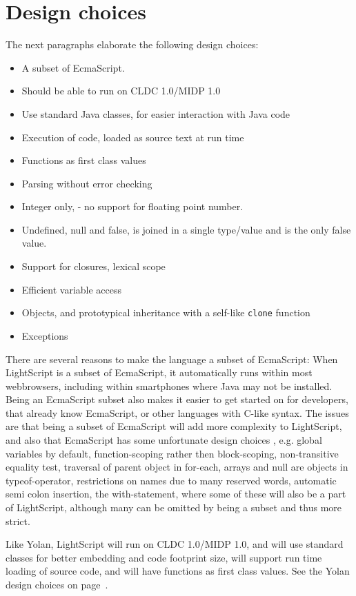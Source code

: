 \documentclass[11pt]{report}
\begin{document}
\section{Design choices}
The next paragraphs elaborate the following design choices:
\begin{itemize}
\item A subset of EcmaScript.
\item Should be able to run on CLDC 1.0/MIDP 1.0
\item Use standard Java classes, for easier interaction with Java code
\item Execution of code, loaded as source text at run time
\item Functions as first class values
\item Parsing without error checking
\item Integer only, - no support for floating point number.
\item Undefined, null and false, is joined in a single type/value and is the only false value.
\item Support for closures, lexical scope
\item Efficient variable access
\item Objects, and prototypical inheritance with a self-like \verb|clone| function
\item Exceptions
\end{itemize}

There are several reasons to make the language a subset of EcmaScript:
When LightScript is a subset of EcmaScript, it automatically runs within most webbrowsers, including within smartphones where Java may not be installed.
Being an EcmaScript subset also makes it easier to get started on for developers, that already know EcmaScript, or other languages with C-like syntax.
The issues are that being a subset of EcmaScript will add more complexity to LightScript, and also that EcmaScript has some unfortunate design choices \cite{crockford}, e.g. global variables by default, function-scoping rather then block-scoping, non-transitive equality test, traversal of parent object in for-each, arrays and null are objects in typeof-operator, restrictions on names due to many reserved words, automatic semi colon insertion, the with-statement, 
where some of these will also be a part of LightScript,
although many can be omitted by being a subset and thus more strict. 

Like Yolan, LightScript will run on CLDC 1.0/MIDP 1.0, and will use standard classes for better embedding and code footprint size, will support run time loading of source code, and will have functions as first class values. See the Yolan design choices on page~\pageref{yolandesign}.
\end{document}
